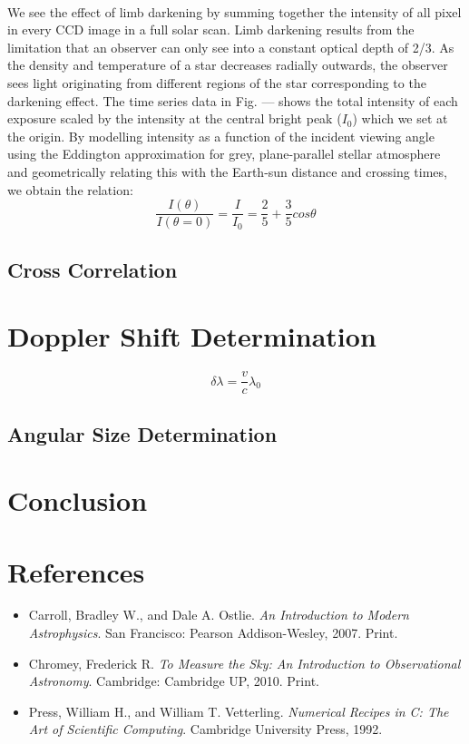 \documentclass[authoryear, 12pt,5p, times]{elsarticle}
\begin{document}
\\
We see the effect of limb darkening by summing together the intensity of all pixel in every CCD image in a full solar scan. Limb darkening results from the limitation that an observer can only see into a constant optical depth of 2/3. As the density and temperature of a star decreases radially outwards, the observer sees light originating from different regions of the star corresponding to the darkening effect. The time series data in Fig. --- shows the total intensity of each exposure scaled by the intensity at the central bright peak ($I_0$) which we set at the origin. By modelling intensity as a function of the incident viewing angle using the Eddington approximation for grey, plane-parallel stellar atmosphere and geometrically relating this with the Earth-sun distance and crossing times, we obtain the relation: 
\begin{equation}
\frac{I(\theta)}{I(\theta=0)}=\frac{I}{I_0}= \frac{2}{5}+\frac{3}{5}cos\theta
\label{eddington_eq}
\end{equation}
\subsection{Cross Correlation}
\section{Doppler Shift Determination}
\begin{equation}
\delta\lambda=\frac{v}{c}\lambda_0
\label{doppler_eq}
\end{equation}

\subsection{Angular Size Determination}
\label{size_calc}
\section{Conclusion}
 
 \section*{References}
 \begin{footnotesize}
 \begin{itemize}
 \item Carroll, Bradley W., and Dale A. Ostlie. \textit{An Introduction to Modern Astrophysics}. San Francisco: Pearson Addison-Wesley, 2007. Print.
\item Chromey, Frederick R. \textit{To Measure the Sky: An Introduction to Observational Astronomy}. Cambridge: Cambridge UP, 2010. Print.
\item Press, William H., and William T. Vetterling. \textit{Numerical Recipes in C: The Art of Scientific Computing}. Cambridge University Press, 1992.  
\end{itemize}
% 
%
  \end{footnotesize}
\end{document}
